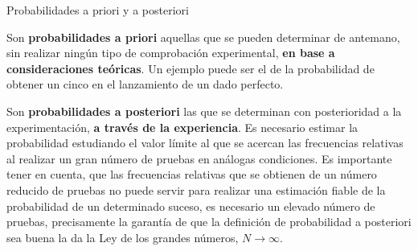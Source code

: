 \begin{myalertblock} {Probabilidades a priori y a posteriori} 

Son  \textbf{probabilidades a priori} aquellas que se pueden determinar de antemano, sin realizar ningún tipo de comprobación experimental, \textbf{en base a consideraciones teóricas}. Un ejemplo puede ser el de la probabilidad de obtener un cinco en el lanzamiento de un dado perfecto. 

\vspace{2mm} Son \textbf{probabilidades a posteriori} las que se determinan con posterioridad a la experimentación, \textbf{a través de la experiencia}. Es necesario estimar la probabilidad estudiando el valor límite al que se acercan las frecuencias relativas al realizar un gran número de pruebas en análogas condiciones. \textcolor{gris}{Es importante tener en cuenta, que las frecuencias relativas que se obtienen de un número reducido de pruebas no puede servir para realizar una estimación fiable de la probabilidad de un determinado suceso, es necesario un elevado número de pruebas, precisamente la garantía de que la definición de probabilidad a posteriori sea buena la da la Ley de los grandes números, $N\to \infty$.}
\end{myalertblock}


